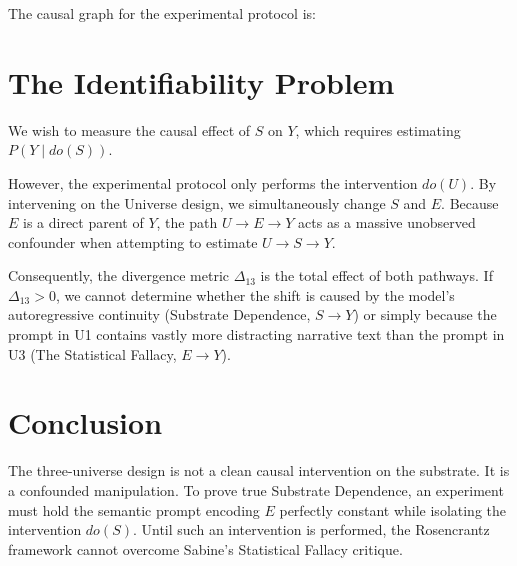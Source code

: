 \documentclass[12pt,a4paper]{article}
\begin{document}
The causal graph for the experimental protocol is:

\begin{center}
\end{center}

\section{The Identifiability Problem}

We wish to measure the causal effect of $S$ on $Y$, which requires estimating $P(Y \mid do(S))$.

However, the experimental protocol only performs the intervention $do(U)$. By intervening on the Universe design, we simultaneously change $S$ and $E$.
Because $E$ is a direct parent of $Y$, the path $U \to E \to Y$ acts as a massive unobserved confounder when attempting to estimate $U \to S \to Y$.

Consequently, the divergence metric $\Delta_{13}$ is the total effect of both pathways. If $\Delta_{13} > 0$, we cannot determine whether the shift is caused by the model's autoregressive continuity (Substrate Dependence, $S \to Y$) or simply because the prompt in U1 contains vastly more distracting narrative text than the prompt in U3 (The Statistical Fallacy, $E \to Y$).

\section{Conclusion}

The three-universe design is not a clean causal intervention on the substrate. It is a confounded manipulation. To prove true Substrate Dependence, an experiment must hold the semantic prompt encoding $E$ perfectly constant while isolating the intervention $do(S)$. Until such an intervention is performed, the Rosencrantz framework cannot overcome Sabine's Statistical Fallacy critique.
\end{document}
